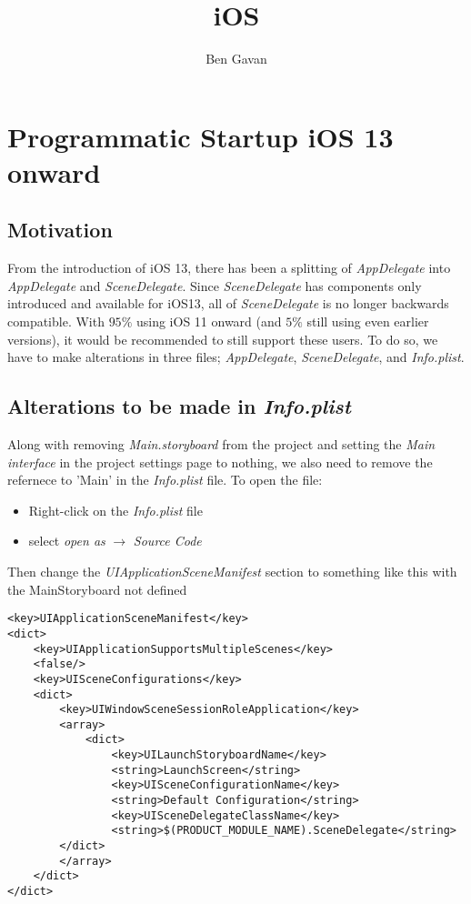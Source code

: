 \documentclass[]{article}
\title{iOS}
\author{Ben Gavan}
\newcommand{\<}{\guilsinglleft}
\renewcommand{\>}{\guilsinglright}
\renewcommand{\it}[1]{\textit{#1}}
\begin{document}
\maketitle
\tableofcontents

\section{Programmatic Startup iOS 13 onward}
\subsection{Motivation}
From the introduction of iOS 13, there has been a splitting of \it{AppDelegate} into \it{AppDelegate} and \it{SceneDelegate}.  Since \it{SceneDelegate} has components only introduced and available for iOS13, all of \it{SceneDelegate} is no longer backwards compatible.  With $95\%$ using iOS 11 onward (and $5\%$ still using even earlier versions), it would be recommended to  still support these users.  To do so, we have to make alterations in three files; \it{AppDelegate}, \it{SceneDelegate}, and \it{Info.plist}.

\subsection{Alterations to be made in \it{Info.plist}}
Along with removing \it{Main.storyboard} from the project and setting the \it{Main interface} in the project settings page to nothing, we also need to remove the refernece to 'Main' in the \it{Info.plist} file.  To open the file:
\begin{itemize}
	\item Right-click on the \it{Info.plist} file
	\item select \it{open as} $\rightarrow$ \it{Source Code}
\end{itemize}
Then change the \it{UIApplicationSceneManifest} section to something like this with the MainStoryboard not defined
\begin{lstlisting} 
<key>UIApplicationSceneManifest</key>
<dict>
	<key>UIApplicationSupportsMultipleScenes</key>
	<false/>
	<key>UISceneConfigurations</key>
	<dict>
		<key>UIWindowSceneSessionRoleApplication</key>
		<array>
			<dict>
				<key>UILaunchStoryboardName</key>
				<string>LaunchScreen</string>
				<key>UISceneConfigurationName</key>
				<string>Default Configuration</string>
				<key>UISceneDelegateClassName</key>
				<string>$(PRODUCT_MODULE_NAME).SceneDelegate</string>
		</dict>
		</array>
	</dict>
</dict>
\end{lstlisting}
\end{document}
